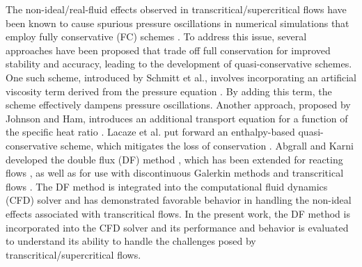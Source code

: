 The non-ideal/real-fluid effects observed in transcritical/supercritical flows have been known to cause spurious pressure oscillations in numerical simulations that employ fully conservative (FC) schemes \cite{schmitt2010large,terashima2012approach,ruiz2012unsteady,hickey2013large,kawai2015robust}. To address this issue, several approaches have been proposed that trade off full conservation for improved stability and accuracy, leading to the development of quasi-conservative schemes. One such scheme, introduced by Schmitt et al., involves incorporating an artificial viscosity term derived from the pressure equation \cite{schmitt2010large}. By adding this term, the scheme effectively dampens pressure oscillations. Another approach, proposed by Johnson and Ham, introduces an additional transport equation for a function of the specific heat ratio \cite{johnsen2012preventing}. Lacaze et al. put forward an enthalpy-based quasi-conservative scheme, which mitigates the loss of conservation \cite{lacaze2019comparison}. Abgrall and Karni developed the double flux (DF) method \cite{abgrall2001computations}, which has been extended for reacting flows \cite{billet2003adaptive}, as well as for use with discontinuous Galerkin methods \cite{billet2011runge,lv2014discontinuous} and transcritical flows \cite{ma2017entropy,tudisco2020numerical}. The DF method \cite{ma2017entropy} is integrated into the computational fluid dynamics (CFD) solver and has demonstrated favorable behavior in handling the non-ideal effects associated with transcritical flows. In the present work, the DF method is incorporated into the CFD solver and its performance and behavior is evaluated to understand its ability to handle the challenges posed by transcritical/supercritical flows.
 
 
